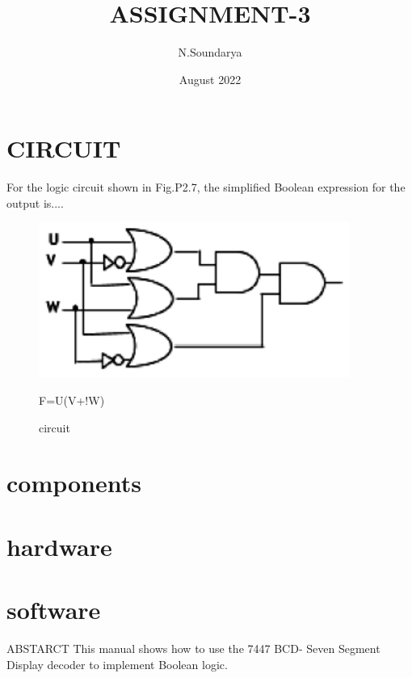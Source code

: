 \documentclass{article}
\title{ASSIGNMENT-3}
\author{N.Soundarya}
\date{August 2022}
\begin{document}
\maketitle

\section{CIRCUIT}

For the logic circuit shown in Fig.P2.7, the simplified Boolean expression for the output is....\\
\begin{figure}
    \centering
    \includegraphics[width=4in]{1.PNG}
    \caption{F=U(V+!W)}
    \caption{circuit}
    \label{fig:circuit}
\end{figure}
\section{components}
\section{hardware}
\section{software}
ABSTARCT This manual shows how to use the 7447 BCD-
Seven Segment Display decoder to implement Boolean logic.
\end{document}
